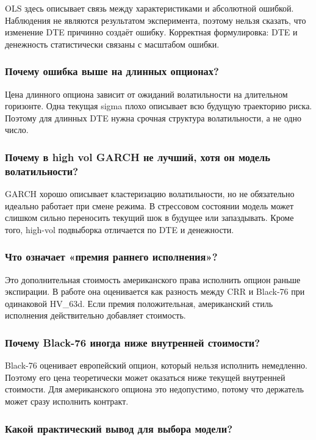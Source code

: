 \documentclass[11pt,a4paper]{article}
\begin{document}
OLS здесь описывает связь между характеристиками и абсолютной ошибкой. Наблюдения не являются результатом эксперимента, поэтому нельзя сказать, что изменение DTE причинно создаёт ошибку. Корректная формулировка: DTE и денежность статистически связаны с масштабом ошибки.

\subsubsection{Почему ошибка выше на длинных опционах?}

Цена длинного опциона зависит от ожиданий волатильности на длительном горизонте. Одна текущая sigma плохо описывает всю будущую траекторию риска. Поэтому для длинных DTE нужна срочная структура волатильности, а не одно число.

\subsubsection{Почему в high vol GARCH не лучший, хотя он модель волатильности?}

GARCH хорошо описывает кластеризацию волатильности, но не обязательно идеально работает при смене режима. В стрессовом состоянии модель может слишком сильно переносить текущий шок в будущее или запаздывать. Кроме того, high-vol подвыборка отличается по DTE и денежности.

\subsubsection{Что означает «премия раннего исполнения»?}

Это дополнительная стоимость американского права исполнить опцион раньше экспирации. В работе она оценивается как разность между CRR и Black-76 при одинаковой HV\_63d. Если премия положительная, американский стиль исполнения действительно добавляет стоимость.

\subsubsection{Почему Black-76 иногда ниже внутренней стоимости?}

Black-76 оценивает европейский опцион, который нельзя исполнить немедленно. Поэтому его цена теоретически может оказаться ниже текущей внутренней стоимости. Для американского опциона это недопустимо, потому что держатель может сразу исполнить контракт.

\subsubsection{Какой практический вывод для выбора модели?}
\end{document}
